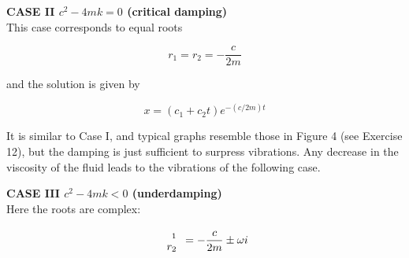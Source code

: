 \documentclass[12pt]{article}
\begin{document}
      \textbf{CASE II $c^2 - 4mk = 0$ (critical damping)} \\
      This case corresponds to equal roots 

      \begin{equation*}
        r_1 = r_2 = -\frac{c}{2m}
      \end{equation*}

      and the solution is given by 
      
      \begin{equation*}
        x = (c_1 + c_2t)e^{-(c/2m)t}
      \end{equation*}

      It is similar to Case I, and typical graphs resemble those in Figure 4 (see Exercise 12),
      but the damping is just sufficient to surpress vibrations. Any decrease in the viscosity
      of the fluid leads to the vibrations of the following case.

      \textbf{CASE III $c^2 - 4mk < 0$ (underdamping)} \\

      Here the roots are complex: 

      \begin{equation*}
        \begin{array} 
          r_1 \\
          r_2 
        \end{array}   = -\frac{c}{2m} \pm \omega i 
      \end{equation*}
\end{document}
